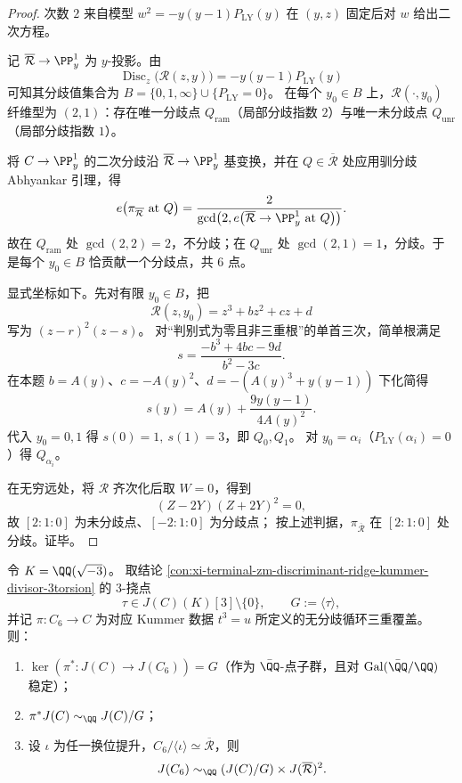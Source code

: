\begin{proof}
次数 \(2\) 来自模型
\(
w^2=-y(y-1)P_{\mathrm{LY}}(y)
\)
在 \((y,z)\) 固定后对 \(w\) 给出二次方程。

记 \(\overline{\mathcal R}\to\PP^1_y\) 为 \(y\)-投影。由
\[
\operatorname{Disc}_z\bigl(\mathscr R(z,y)\bigr)=-y(y-1)P_{\mathrm{LY}}(y)
\]
可知其分歧值集合为
\(
B=\{0,1,\infty\}\cup\{P_{\mathrm{LY}}=0\}
\)。
在每个 \(y_0\in B\) 上，\(\mathscr R(\cdot,y_0)\) 纤维型为 \((2,1)\)：存在唯一分歧点 \(Q_{\mathrm{ram}}\)（局部分歧指数 \(2\)）与唯一未分歧点 \(Q_{\mathrm{unr}}\)（局部分歧指数 \(1\)）。

将 \(C\to\PP^1_y\) 的二次分歧沿 \(\overline{\mathcal R}\to\PP^1_y\) 基变换，并在 \(Q\in\overline{\mathcal R}\) 处应用驯分歧 Abhyankar 引理，得
\[
e\!\left(\pi_{\overline{\mathcal R}}\ \text{at}\ Q\right)
=\frac{2}{\gcd\!\left(2,e\!\left(\overline{\mathcal R}\to\PP^1_y\ \text{at}\ Q\right)\right)}.
\]
故在 \(Q_{\mathrm{ram}}\) 处 \(\gcd(2,2)=2\)，不分歧；在 \(Q_{\mathrm{unr}}\) 处 \(\gcd(2,1)=1\)，分歧。于是每个 \(y_0\in B\) 恰贡献一个分歧点，共 \(6\) 点。

显式坐标如下。先对有限 \(y_0\in B\)，把
\[
\mathscr R(z,y_0)=z^3+bz^2+cz+d
\]
写为 \((z-r)^2(z-s)\)。
对“判别式为零且非三重根”的单首三次，简单根满足
\[
s=\frac{-b^3+4bc-9d}{b^2-3c}.
\]
在本题 \(b=A(y)\)、\(c=-A(y)^2\)、\(d=-(A(y)^3+y(y-1))\) 下化简得
\[
s(y)=A(y)+\frac{9y(y-1)}{4A(y)^2}.
\]
代入 \(y_0=0,1\) 得 \(s(0)=1,\ s(1)=3\)，即 \(Q_0,Q_1\)。
对 \(y_0=\alpha_i\)（\(P_{\mathrm{LY}}(\alpha_i)=0\)）得 \(Q_{\alpha_i}\)。

在无穷远处，将 \(\mathscr R\) 齐次化后取 \(W=0\)，得到
\[
(Z-2Y)(Z+2Y)^2=0,
\]
故 \([2:1:0]\) 为未分歧点、\([-2:1:0]\) 为分歧点；
按上述判据，\(\pi_{\overline{\mathcal R}}\) 在 \([2:1:0]\) 处分歧。证毕。
\end{proof}

\begin{theorem}\label{thm:xi-s3-closure-pullback-kernel-cyclic3-equivariant-splitting}
令 \(K=\QQ(\sqrt{-3})\)。
取结论 \ref{con:xi-terminal-zm-discriminant-ridge-kummer-divisor-3torsion} 的 \(3\)-挠点
\[
\tau\in J(C)(K)[3]\setminus\{0\},\qquad
G:=\langle\tau\rangle,
\]
并记 \(\pi:C_6\to C\) 为对应 Kummer 数据 \(t^3=u\) 所定义的无分歧循环三重覆盖。
则：
\begin{enumerate}
  \item \(\ker(\pi^\ast:J(C)\to J(C_6))=G\)（作为 \(\bar\QQ\)-点子群，且对 \(\mathrm{Gal}(\bar\QQ/\QQ)\) 稳定）；
  \item \(\pi^\ast J(C)\sim_{\QQ}J(C)/G\)；
  \item 设 \(\iota\) 为任一换位提升，\(C_6/\langle\iota\rangle\simeq\overline{\mathcal R}\)，则
  \[
  J(C_6)\sim_{\QQ}(J(C)/G)\times J(\overline{\mathcal R})^2.
  \]
\end{enumerate}
\end{theorem}

